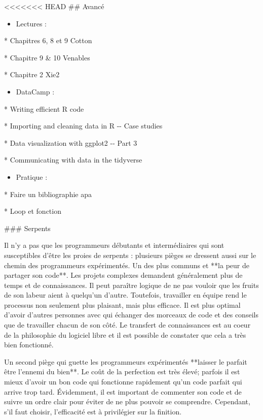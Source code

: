 \documentclass[
  letterpaper,
]{scrbook}
\providecommand{\tightlist}{%
  \setlength{\itemsep}{0pt}\setlength{\parskip}{0pt}}\usepackage{longtable,booktabs,array}
\begin{document}
<<<<<<< HEAD
\#\# Avancé

\begin{itemize}
\tightlist
\item
  Lectures :
\end{itemize}

* Chapitres 6, 8 et 9 Cotton

* Chapitre 9 \& 10 Venables

* Chapitre 2 Xie2

\begin{itemize}
\tightlist
\item
  DataCamp :
\end{itemize}

* Writing efficient R code

* Importing and cleaning data in R -\/- Case studies

* Data visualization with ggplot2 -\/- Part 3

* Communicating with data in the tidyverse

\begin{itemize}
\tightlist
\item
  Pratique :
\end{itemize}

* Faire un bibliographie apa

* Loop et fonction

\#\#\# Serpents

Il n'y a pas que les programmeurs débutants et intermédiaires qui sont
susceptibles d'être les proies de serpents : plusieurs pièges se
dressent aussi sur le chemin des programmeurs expérimentés. Un des plus
communs et **la peur de partager son code**. Les projets complexes
demandent généralement plus de temps et de connaissances. Il peut
paraître logique de ne pas vouloir que les fruits de son labeur aient à
quelqu'un d'autre. Toutefois, travailler en équipe rend le processus non
seulement plus plaisant, mais plus efficace. Il est plus optimal d'avoir
d'autres personnes avec qui échanger des morceaux de code et des
conseils que de travailler chacun de son côté. Le transfert de
connaissances est au coeur de la philosophie du logiciel libre et il est
possible de constater que cela a très bien fonctionné.

Un second piège qui guette les programmeurs expérimentés **laisser le
parfait être l'ennemi du bien**. Le coût de la perfection est très
élevé; parfois il est mieux d'avoir un bon code qui fonctionne
rapidement qu'un code parfait qui arrive trop tard. Évidemment, il est
important de commenter son code et de suivre un ordre clair pour éviter
de ne plus pouvoir se comprendre. Cependant, s'il faut choisir,
l'efficacité est à privilégier sur la finition.
\end{document}
